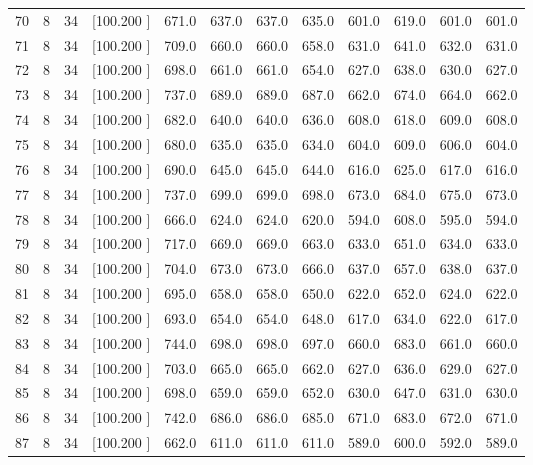 \documentclass[12pt,a4paper]{article}
\begin{document}
\begin{center}
{\begin{tabular}{r r r r r r r r r r r r}
  70&  8& 34&[100.200   ]&   671.0&   637.0&   637.0&   635.0&   601.0&   619.0&   601.0&   601.0\\[-0.02in]
  71&  8& 34&[100.200   ]&   709.0&   660.0&   660.0&   658.0&   631.0&   641.0&   632.0&   631.0\\[-0.02in]
  72&  8& 34&[100.200   ]&   698.0&   661.0&   661.0&   654.0&   627.0&   638.0&   630.0&   627.0\\[-0.02in]
  73&  8& 34&[100.200   ]&   737.0&   689.0&   689.0&   687.0&   662.0&   674.0&   664.0&   662.0\\[-0.02in]
  74&  8& 34&[100.200   ]&   682.0&   640.0&   640.0&   636.0&   608.0&   618.0&   609.0&   608.0\\[-0.02in]
  75&  8& 34&[100.200   ]&   680.0&   635.0&   635.0&   634.0&   604.0&   609.0&   606.0&   604.0\\[-0.02in]
  76&  8& 34&[100.200   ]&   690.0&   645.0&   645.0&   644.0&   616.0&   625.0&   617.0&   616.0\\[-0.02in]
  77&  8& 34&[100.200   ]&   737.0&   699.0&   699.0&   698.0&   673.0&   684.0&   675.0&   673.0\\[-0.02in]
  78&  8& 34&[100.200   ]&   666.0&   624.0&   624.0&   620.0&   594.0&   608.0&   595.0&   594.0\\[-0.02in]
  79&  8& 34&[100.200   ]&   717.0&   669.0&   669.0&   663.0&   633.0&   651.0&   634.0&   633.0\\[-0.02in]
  80&  8& 34&[100.200   ]&   704.0&   673.0&   673.0&   666.0&   637.0&   657.0&   638.0&   637.0\\[-0.02in]
  81&  8& 34&[100.200   ]&   695.0&   658.0&   658.0&   650.0&   622.0&   652.0&   624.0&   622.0\\[-0.02in]
  82&  8& 34&[100.200   ]&   693.0&   654.0&   654.0&   648.0&   617.0&   634.0&   622.0&   617.0\\[-0.02in]
  83&  8& 34&[100.200   ]&   744.0&   698.0&   698.0&   697.0&   660.0&   683.0&   661.0&   660.0\\[-0.02in]
  84&  8& 34&[100.200   ]&   703.0&   665.0&   665.0&   662.0&   627.0&   636.0&   629.0&   627.0\\[-0.02in]
  85&  8& 34&[100.200   ]&   698.0&   659.0&   659.0&   652.0&   630.0&   647.0&   631.0&   630.0\\[-0.02in]
  86&  8& 34&[100.200   ]&   742.0&   686.0&   686.0&   685.0&   671.0&   683.0&   672.0&   671.0\\[-0.02in]
  87&  8& 34&[100.200   ]&   662.0&   611.0&   611.0&   611.0&   589.0&   600.0&   592.0&   589.0\\[-0.02in]

\end{tabular}}
\end{center}
\end{document}
